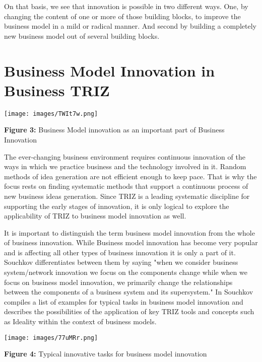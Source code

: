 \documentclass[11pt,a4paper]{article}
\begin{document}
On that basis, we see that innovation is possible in two different ways. One,
by changing the content of one or more of those building blocks, to improve
the business model in a mild or radical manner. And second by building a
completely new business model out of several building blocks.

\section{Business Model Innovation in Business TRIZ}
\begin{center}
  \texttt{[image: images/TWIt7w.png]}
  
  \textbf{Figure 3:} Business Model innovation as an important part of
  Business Innovation \cite{5}
\end{center}

The ever-changing business environment requires continuous innovation of the
ways in which we practice business and the technology involved in it. Random
methods of idea generation are not efficient enough to keep pace. That is why
the focus rests on finding systematic methods that support a continuous
process of new business ideas generation. Since TRIZ is a leading systematic
discipline for supporting the early stages of innovation, it is only logical
to explore the applicability of TRIZ to business model innovation as well.

It is important to distinguish the term business model innovation from the
whole of business innovation. While Business model innovation has become very
popular and is affecting all other types of business innovation it is only a
part of it. Souchkov \cite{10} differentiates between them by saying "when we
consider business system/network innovation we focus on the components change
while when we focus on business model innovation, we primarily change the
relationships between the components of a business system and its
supersystem." In \cite{10} Souchkov compiles a list of examples for typical
tasks in business model innovation and describes the possibilities of the
application of key TRIZ tools and concepts such as Ideality within the context
of business models.


\begin{center}
  \texttt{[image: images/77uMRr.png]}
    
  \textbf{Figure 4:} Typical innovative tasks for business model innovation
\end{center}
\end{document}
